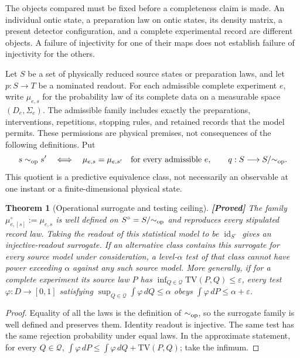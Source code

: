 \documentclass[11pt,a4paper]{article}
\newtheorem{theorem}{Theorem}[section]
\theoremstyle{definition}
\theoremstyle{remark}\newtheorem{remark}[theorem]{Remark}
\newcommand{\status}[1]{\textbf{[#1]}\quad}
\newcommand{\TV}{\mathrm{TV}}
\begin{document}
The objects compared must be fixed before a completeness claim is made.
An individual ontic state, a preparation law on ontic states, its density
matrix, a present detector configuration, and a complete experimental
record are different objects. A failure of injectivity for one of their
maps does not establish failure of injectivity for the others.

Let $S$ be a set of physically reduced source states or preparation laws,
and let $p:S\to T$ be a nominated readout. For each admissible complete
experiment $e$, write $\mu_{e,s}$ for the probability law of its complete
data on a measurable space $(D_e,\Sigma_e)$. The admissible family includes
exactly the preparations, interventions, repetitions, stopping rules, and
retained records that the model permits. These permissions are physical
premises, not consequences of the following definitions. Put
\[
 s\sim_{\rm op}s'\quad\Longleftrightarrow\quad
 \mu_{e,s}=\mu_{e,s'}\quad\hbox{for every admissible }e,
 \qquad q:S\longrightarrow S/{\sim_{\rm op}}.
\]
This quotient is a predictive equivalence class, not necessarily an
observable at one instant or a finite-dimensional physical state.

\begin{theorem}[Operational surrogate and testing ceiling]
\label{op:surrogate}
\status{Proved}
The family $\mu^\circ_{e,[s]}:=\mu_{e,s}$ is well defined on
$S^\circ=S/{\sim_{\rm op}}$ and reproduces every stipulated record law.
Taking the readout of this statistical model to be $\operatorname{id}_{S^\circ}$
gives an injective-readout surrogate. If an alternative class contains this
surrogate for every source model under consideration, a level-$\alpha$
test of that class cannot have power exceeding $\alpha$ against any such
source model. More generally, if for a complete experiment its source law
$P$ has $\inf_{Q\in\mathcal Q}\TV(P,Q)\le\varepsilon$, every test
$\varphi:D\to[0,1]$ satisfying $\sup_{Q\in\mathcal Q}\int\varphi\,dQ\le\alpha$
obeys $\int\varphi\,dP\le\alpha+\varepsilon$.
\end{theorem}

\begin{proof}
Equality of all the laws is the definition of $\sim_{\rm op}$, so the
surrogate family is well defined and preserves them. Identity readout is
injective. The same test has the same rejection probability under equal
laws. In the approximate statement, for every $Q\in\mathcal Q$,
$\int\varphi\,dP\le\int\varphi\,dQ+\TV(P,Q)$; take the infimum.
\end{proof}
\end{document}
